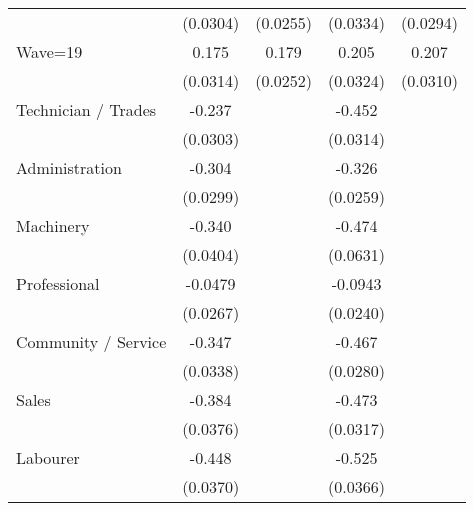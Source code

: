 {\begin{tabular}{l*{4}{c}}
                    &    (0.0304)         &    (0.0255)         &    (0.0334)         &    (0.0294)         \\
[1em]
Wave=19             &       0.175\sym{***}&       0.179\sym{***}&       0.205\sym{***}&       0.207\sym{***}\\
                    &    (0.0314)         &    (0.0252)         &    (0.0324)         &    (0.0310)         \\
[1em]
Technician / Trades &      -0.237\sym{***}&                     &      -0.452\sym{***}&                     \\
                    &    (0.0303)         &                     &    (0.0314)         &                     \\
[1em]
Administration      &      -0.304\sym{***}&                     &      -0.326\sym{***}&                     \\
                    &    (0.0299)         &                     &    (0.0259)         &                     \\
[1em]
Machinery           &      -0.340\sym{***}&                     &      -0.474\sym{***}&                     \\
                    &    (0.0404)         &                     &    (0.0631)         &                     \\
[1em]
Professional        &     -0.0479         &                     &     -0.0943\sym{***}&                     \\
                    &    (0.0267)         &                     &    (0.0240)         &                     \\
[1em]
Community / Service &      -0.347\sym{***}&                     &      -0.467\sym{***}&                     \\
                    &    (0.0338)         &                     &    (0.0280)         &                     \\
[1em]
Sales               &      -0.384\sym{***}&                     &      -0.473\sym{***}&                     \\
                    &    (0.0376)         &                     &    (0.0317)         &                     \\
[1em]
Labourer            &      -0.448\sym{***}&                     &      -0.525\sym{***}&                     \\
                    &    (0.0370)         &                     &    (0.0366)         &                     \\

\end{tabular}}
